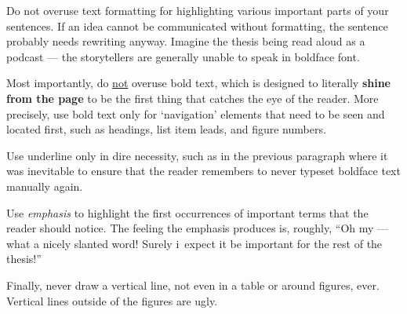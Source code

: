 Do not overuse text formatting for highlighting various important parts of your sentences. If an idea cannot be communicated without formatting, the sentence probably needs rewriting anyway. Imagine the thesis being read aloud as a podcast --- the storytellers are generally unable to speak in boldface font.

Most importantly, do \underline{not} overuse bold text, which is designed to literally \textbf{shine from the page} to be the first thing that catches the eye of the reader. More precisely, use bold text only for `navigation' elements that need to be seen and located first, such as headings, list item leads, and figure numbers.

Use underline only in dire necessity, such as in the previous paragraph where it was inevitable to ensure that the reader remembers to never typeset boldface text manually again.

Use \emph{emphasis} to highlight the first occurrences of important terms that the reader should notice. The feeling the emphasis produces is, roughly, ``Oh my --- what a nicely slanted word! Surely i~expect it be important for the rest of the thesis!''

Finally, never draw a vertical line, not even in a table or around figures, ever. Vertical lines outside of the figures are ugly.
